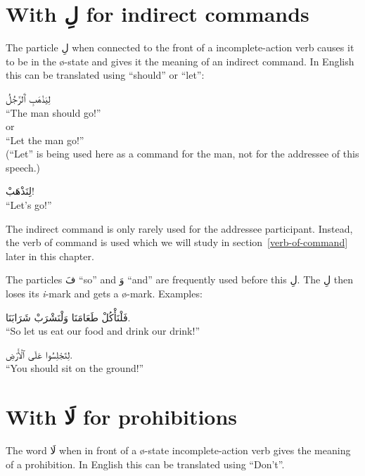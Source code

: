 \documentclass[
  10pt,
]{book}
\begin{document}
\section{\texorpdfstring{With \foreignlanguage{arabic}{لِ} for indirect commands}{With لِ for indirect commands}}\label{indirect-commands}

The particle \foreignlanguage{arabic}{لِ} when connected to the front of a
incomplete-action verb
causes it to be in the
ø-state
and gives it the meaning of an indirect command. In English this can be translated using \enquote{should} or \enquote{let}:

\foreignlanguage{arabic}{لِيَذْهَبِ ٱَلرَّجُلُ}\\
\enquote{The man should go!}\\
or\\
\enquote{Let the man go!}\\
(\enquote{Let} is being used here as a command for the man, not for the addressee of this speech.)

\foreignlanguage{arabic}{لِنَذْهَبْ!}\\
\enquote{Let's go!}

The indirect command is only rarely used for the addressee participant. Instead, the verb of command is used which we will study in section~\ref{verb-of-command} later in this chapter.

The particles \foreignlanguage{arabic}{فَ} \enquote{so} and \foreignlanguage{arabic}{وَ} \enquote{and} are frequently used before this \foreignlanguage{arabic}{لِ}.
The \foreignlanguage{arabic}{لِ} then loses its \emph{i}-mark and gets a
ø-mark. Examples:

\foreignlanguage{arabic}{فَلْنَأْکُلْ طَعَامَنَا وَلْنَشْرَبْ شَرَابَنَا.}\\
\enquote{So let us eat our food and drink our drink!}

\foreignlanguage{arabic}{لِتَجْلِسُوا عَلَى ٱلْأَرْضِ.}\\
\enquote{You should sit on the ground!}

\section{\texorpdfstring{With \foreignlanguage{arabic}{لَا} for prohibitions}{With لَا for prohibitions}}\label{la-of-prohibition}

The word \foreignlanguage{arabic}{لَا} when in front of a
ø-state
incomplete-action verb
gives the meaning of a prohibition.
In English this can be translated using \enquote{Don't}.
\end{document}
